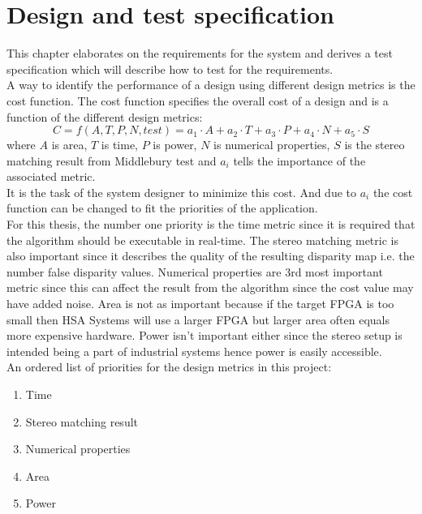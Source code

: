 \chapter{Design and test specification} \label{ch:req}
This chapter elaborates on the requirements for the system and derives a test specification which will describe how to test for the requirements.\\

A way to identify the performance of a design using different design metrics is the cost function. The cost function specifies the overall cost of a design and is a function of the different design metrics:
\begin{equation}
C = f(A,T,P,N,test) = a_1\cdot A + a_2 \cdot T + a_3 \cdot P + a_4 \cdot N + a_5 \cdot S
\end{equation}
where $A$ is area, $T$ is time, $P$ is power, $N$ is numerical properties, $S$ is the stereo matching result from Middlebury test and $a_i$ tells the importance of the associated metric.\\
It is the task of the system designer to minimize this cost. And due to $a_i$ the cost function can be changed to fit the priorities of the application.\\

For this thesis, the number one priority is the time metric since it is required that the algorithm should be executable in real-time. The stereo matching metric is also important since it describes the quality of the resulting disparity map i.e. the number false disparity values. Numerical properties are 3rd most important metric since this can affect the result from the algorithm since the cost value may have added noise. Area is not as important because if the target FPGA is too small then HSA Systems will use a larger FPGA but larger area often equals more expensive hardware. Power isn't important either since the stereo setup is intended being a part of industrial systems hence power is easily accessible.\\

An ordered list of priorities for the design metrics in this project:
\begin{multicols}{2}
  \begin{enumerate}
    \item Time
    \item Stereo matching result
    \item Numerical properties
    \item Area 
    \item Power\\~\\
  \end{enumerate}
\end{multicols}

